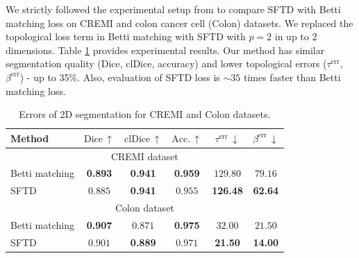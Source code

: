 \documentclass[runningheads]{llncs}
\begin{document}
We strictly followed the experimental setup from \cite{stucki2023topologically} to compare SFTD with Betti matching loss on CREMI \cite{funke2018large} and colon cancer cell (Colon) \cite{carpenter2006cellprofiler} datasets. We replaced the topological loss term in Betti matching with SFTD with $p=2$ in up to $2$ dimensions. Table \ref{tbl:2d_segm} provides experimental results. Our method has similar segmentation quality (Dice, clDice, accuracy) and lower topological errors ($\tau^{\text{err}}$, $\beta^{\text{err}}$) - up to 35\%. Also, evaluation of SFTD loss is $\sim 35$ times faster than Betti matching loss.

\begin{table}[hp!]
\caption{Errors of 2D segmentation for CREMI and Colon datasets.}
\label{tbl:2d_segm}
\begin{center}
\begin{small}
\begin{sc}
\begin{tabular}{lccccc}
\toprule
Method & $\text{Dice}$\,$\uparrow$ & $\text{clDice}$\,$\uparrow$ & $\text{Acc.}$\,$\uparrow$ & $\tau^{\text{err}}$\,$\downarrow$ & $\beta^{\text{err}}$\,$\downarrow$\\
\midrule
\multicolumn{6}{c}{CREMI dataset \cite{funke2018large}} \\ \midrule
Betti matching \cite{stucki2023topologically}            & \textbf{0.893} & \textbf{0.941} & \textbf{0.959} & $129.80$ & $79.16$ \\
SFTD & $0.885$ & \textbf{0.941} & $0.955$ & \textbf{126.48} & \textbf{62.64} \\ \midrule
\multicolumn{6}{c}{Colon dataset \cite{carpenter2006cellprofiler}} \\ \midrule
Betti matching \cite{stucki2023topologically} & \textbf{0.907} & $0.871$ & \textbf{0.975} & $32.00$ & $21.50$ \\
SFTD & $0.901$ & \textbf{0.889} & $0.971$ & \textbf{21.50} & \textbf{14.00} \\
\bottomrule
\end{tabular}
\end{sc}
\end{small}
\end{center}
\end{table}
\end{document}
